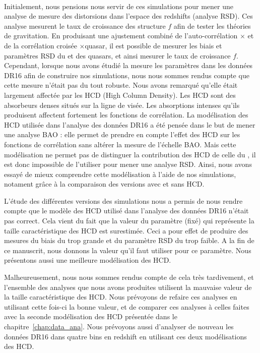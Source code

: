 \paragraph{}
Initialement, nous pensions nous servir de ces simulations pour mener une analyse de mesure des distorsions dans l'espace des redshifts (analyse RSD). Ces analyse mesurent le taux de croissance des structure $f$ afin de tester les théories de gravitation.
En produisant une ajustement combiné de l'auto-corrélation \lya{}$\times$\lya{} et de la corrélation croisée \lya{}$\times$quasar, il est possible de mesurer les biais et paramètres RSD du \lya{} et des quasars, et ainsi mesurer le taux de croissance $f$.
Cependant, lorsque nous avons étudié la mesure les paramètres \lya{} dans les données DR16 afin de construire nos simulations, nous nous sommes rendus compte que cette mesure n'était pas du tout robuste.
Nous avons remarqué qu'elle était largement affectée par les HCD (High Column Density). Les HCD sont des absorbeurs denses situés sur la ligne de visée. Les absorptions intenses qu'ils produisent affectent fortement les fonctions de corrélation.
La modélisation des HCD utilisée dans l'analyse des données DR16 a été pensée dans le but de mener une analyse BAO : elle permet de prendre en compte l'effet des HCD sur les fonctions de corrélation sans altérer la mesure de l'échelle BAO.
Mais cette modélisation ne permet pas de distinguer la contribution des HCD de celle du \lya{}, il est donc impossible de l'utiliser pour mener une analyse RSD.
Ainsi, nous avons essayé de mieux comprendre cette modélisation à l'aide de nos simulations, notament grâce à la comparaison des versions avec et sans HCD.

L'étude des différentes versions des simulations nous a permis de nous rendre compte que le modèle des HCD utilisé dans l'analyse des données DR16 n'était pas correct. Cela vient du fait que la valeur du paramètre (fixé) qui représente la taille caractéristique des HCD est surestimée. Ceci a pour effet de produire des mesures du biais du \lya{} trop grande et du paramètre RSD du \lya{} trop faible.
A la fin de ce manuscrit, nous donnons la valeur qu'il faut utiliser pour ce paramètre. Nous présentons aussi une meilleure modélisation des HCD.

Malheureusement, nous nous sommes rendus compte de cela très tardivement, et l'ensemble des analyses que nous avons produites utilisent la mauvaise valeur de la taille caractéristique des HCD. Nous prévoyons de refaire ces analyses en utilisant cette fois-ci la bonne valeur, et de comparer ces analyses à celles faites avec la seconde modélisation des HCD présentée dans le chapitre~\ref{chap:data_ana}.
Nous prévoyons aussi d'analyser de nouveau les données DR16 dans quatre bins en redshift en utilisant ces deux modélisations des HCD.


